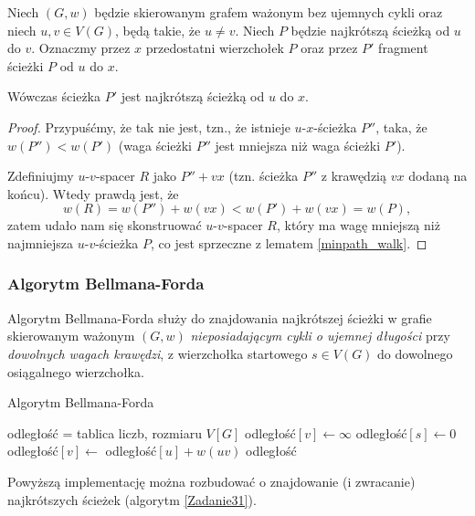 \begin{lemma}
	Niech $(G, w)$ będzie skierowanym grafem ważonym
	bez ujemnych cykli oraz niech $u, v \in V(G)$,
	będą takie, że $u \not = v$. Niech $P$ będzie
	najkrótszą ścieżką od $u$ do $v$. Oznaczmy przez
	$x$ przedostatni wierzchołek $P$ oraz 
	przez $P'$ fragment ścieżki $P$ od $u$ do $x$.
	
	Wówczas ścieżka $P'$ jest najkrótszą ścieżką od $u$ do 
	$x$.
	
	\begin{proof}
		Przypuśćmy, że tak nie jest, tzn., że istnieje 
		$u$-$x$-ścieżka $P''$, taka, że 
		$w(P'') < w(P')$ (waga ścieżki $P''$
		jest mniejsza niż waga ścieżki $P'$).
		
		Zdefiniujmy $u$-$v$-spacer $R$ jako $P'' + vx$
		(tzn. ścieżka $P''$ z krawędzią $vx$ 
		dodaną na końcu). Wtedy prawdą jest, że
		\[w(R) = w(P'') + w(vx) <
		w(P') + w(vx) = w(P),\]
		zatem udało nam się skonstruować 
		$u$-$v$-spacer $R$, który ma wagę mniejszą niż
		najmniejsza $u$-$v$-ścieżka $P$, co 
		jest sprzeczne z lematem \ref{minpath_walk}. \qedhere
	\end{proof}
	\label{minpath_subpath}
\end{lemma}
\subsubsection{Algorytm Bellmana-Forda}
Algorytm Bellmana-Forda służy do znajdowania 
najkrótszej ścieżki w grafie skierowanym ważonym $(G, w)$
\emph{nieposiadającym cykli o ujemnej długości} przy 
\emph{dowolnych wagach krawędzi},
z wierzchołka startowego $s \in V(G)$
do dowolnego osiągalnego wierzchołka.

\begin{algorithm}[H]
	\caption{Algorytm Bellmana-Forda}\label{bellmanford_alg}
	\begin{algorithmic}[1]
		\State odległość = tablica liczb, rozmiaru $V[G]$
		\State odległość$[v] \gets \infty$
		\EndFor
		\State odległość$[s] \gets 0$
		\State odległość$[v] \gets$ odległość$[u] + w(uv)$ 
		\EndIf
		\EndFor
		\EndFor
		\State \Return odległość
		\EndProcedure
	\end{algorithmic}
	\label{bellman_ford}
\end{algorithm}
Powyższą implementację można rozbudować o
znajdowanie (i zwracanie) najkrótszych ścieżek
(algorytm \ref{Zadanie31}).

